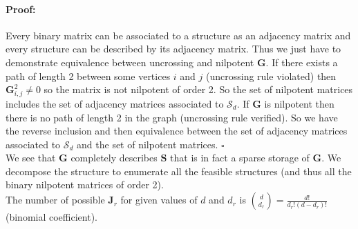 \documentclass[12pt,a4paper]{report}
\begin{document}
	\paragraph{Proof:} Every binary matrix can be associated to a structure as an adjacency matrix and every structure can be described by its adjacency matrix. Thus we just have to demonstrate equivalence between uncrossing and nilpotent $\boldsymbol{G}$. If there exists a path of length 2 between some vertices $i$ and $j$ (uncrossing rule violated) then $\boldsymbol{G}^2_{i,j}\neq 0$ so the matrix is not nilpotent of order 2. So the set of nilpotent matrices includes the set of adjacency matrices associated to $\mathcal{S}_d$. If $\boldsymbol{G}$ is nilpotent then there is no path of length 2 in the graph (uncrossing rule verified). So we have the reverse inclusion and then equivalence between the set of adjacency matrices associated to $\mathcal{S}_d$ and the set of nilpotent matrices. $\square$\\
	
	We see that $\boldsymbol{G}$ completely describes $\boldsymbol{S}$ that is in fact a sparse storage of $\boldsymbol{G}$.
	We decompose the structure to enumerate all the feasible structures (and thus all the binary nilpotent matrices of order 2).\\
	
	

			The number of possible $\boldsymbol{J}_r$ for given values of $d$ and $d_r$ is ${d \choose d_r}=\frac{d!}{d_r!(d-d_r)!}$ (binomial coefficient).\\
	
\end{document}
